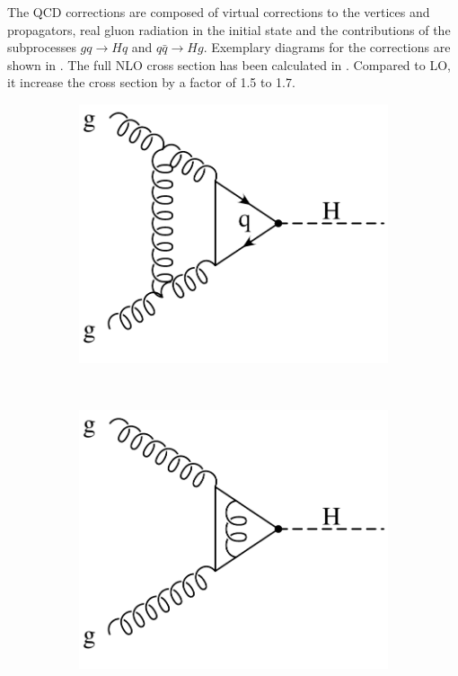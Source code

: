 The QCD corrections are composed of virtual corrections to the vertices and propagators, real gluon radiation in the initial state and the contributions of the subprocesses $gq \rightarrow Hq$ and $q \bar q \rightarrow Hg$.
Exemplary diagrams for the corrections are shown in .
The full NLO cross section has been calculated in \cite{gfusionnlo1,gfusionnlo2,gfusionnlo3}.
Compared to LO, it increase the cross section by a factor of \num{1.5} to \num{1.7}.
%
\begin{figure}
\centering
\begin{subfigure}[]{0.3\textwidth}
	\includegraphics[width=\textwidth]{images/gluonfusion_virtual1.pdf}
	\caption{}
\end{subfigure}
~
\begin{subfigure}[]{0.3\textwidth}
	\includegraphics[width=\textwidth]{images/gluonfusion_virtual2.pdf}

\end{subfigure}
\end{figure}
